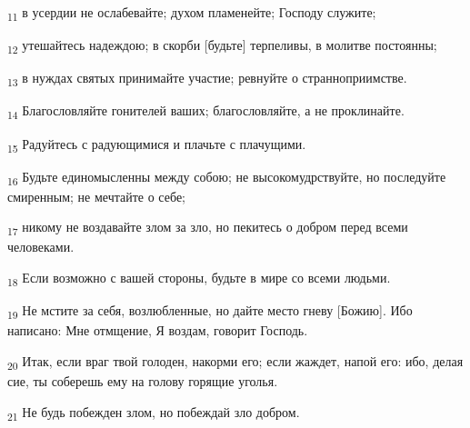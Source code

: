 \begin{tcolorbox}
\textsubscript{11} в усердии не ослабевайте; духом пламенейте; Господу служите;
\end{tcolorbox}
\begin{tcolorbox}
\textsubscript{12} утешайтесь надеждою; в скорби [будьте] терпеливы, в молитве постоянны;
\end{tcolorbox}
\begin{tcolorbox}
\textsubscript{13} в нуждах святых принимайте участие; ревнуйте о странноприимстве.
\end{tcolorbox}
\begin{tcolorbox}
\textsubscript{14} Благословляйте гонителей ваших; благословляйте, а не проклинайте.
\end{tcolorbox}
\begin{tcolorbox}
\textsubscript{15} Радуйтесь с радующимися и плачьте с плачущими.
\end{tcolorbox}
\begin{tcolorbox}
\textsubscript{16} Будьте единомысленны между собою; не высокомудрствуйте, но последуйте смиренным; не мечтайте о себе;
\end{tcolorbox}
\begin{tcolorbox}
\textsubscript{17} никому не воздавайте злом за зло, но пекитесь о добром перед всеми человеками.
\end{tcolorbox}
\begin{tcolorbox}
\textsubscript{18} Если возможно с вашей стороны, будьте в мире со всеми людьми.
\end{tcolorbox}
\begin{tcolorbox}
\textsubscript{19} Не мстите за себя, возлюбленные, но дайте место гневу [Божию]. Ибо написано: Мне отмщение, Я воздам, говорит Господь.
\end{tcolorbox}
\begin{tcolorbox}
\textsubscript{20} Итак, если враг твой голоден, накорми его; если жаждет, напой его: ибо, делая сие, ты соберешь ему на голову горящие уголья.
\end{tcolorbox}
\begin{tcolorbox}
\textsubscript{21} Не будь побежден злом, но побеждай зло добром.
\end{tcolorbox}
